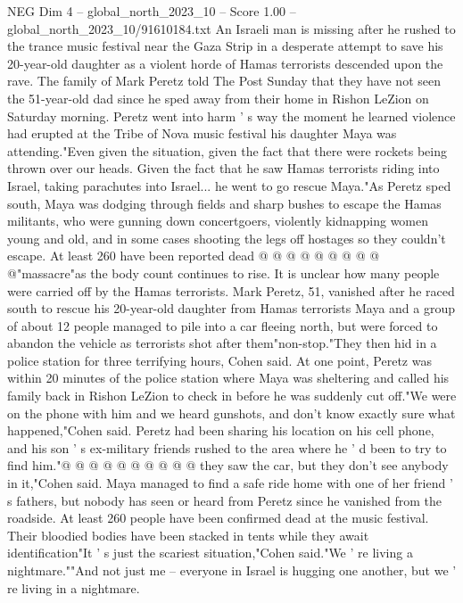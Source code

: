 \begin{textsample}{NEG Dim 4 – global\_north\_2023\_10 – Score 1.00 – global\_north\_2023\_10/91610184.txt}  \label{ex:f4_neg_004}
An Israeli man is missing after he rushed to the trance music festival near the Gaza Strip in a desperate attempt to save his 20-year-old daughter as a violent horde of Hamas terrorists descended upon the rave.
The family of Mark Peretz told The Post Sunday that they have not seen the 51-year-old dad since he sped away from their home in Rishon LeZion on Saturday morning.
Peretz went into harm ' s way the moment he learned violence had erupted at the Tribe of Nova music festival his daughter Maya was attending."Even given the situation, given the fact that there were rockets being thrown over our heads.
Given the fact that he saw Hamas terrorists riding into Israel, taking parachutes into Israel... he went to go rescue Maya."As Peretz sped south, Maya was dodging through fields and sharp bushes to escape the Hamas militants, who were gunning down concertgoers, violently kidnapping women young and old, and in some cases shooting the legs off hostages so they couldn't escape.
At least 260 have been reported dead @ @ @ @ @ @ @ @ @ @"massacre"as the body count continues to rise.
It is unclear how many people were carried off by the Hamas terrorists.
Mark Peretz, 51, vanished after he raced south to rescue his 20-year-old daughter from Hamas terrorists Maya and a group of about 12 people managed to pile into a car fleeing north, but were forced to abandon the vehicle as terrorists shot after them"non-stop."They then hid in a police station for three terrifying hours, Cohen said.
At one point, Peretz was within 20 minutes of the police station where Maya was sheltering and called his family back in Rishon LeZion to check in before he was suddenly cut off."We were on the phone with him and we heard gunshots, and don't know exactly sure what happened,"Cohen said.
Peretz had been sharing his location on his cell phone, and his son ' s ex-military friends rushed to the area where he ' d been to try to find him."@ @ @ @ @ @ @ @ @ @ they saw the car, but they don't see anybody in it,"Cohen said.
Maya managed to find a safe ride home with one of her friend ' s fathers, but nobody has seen or heard from Peretz since he vanished from the roadside.
At least 260 people have been confirmed dead at the music festival.
Their bloodied bodies have been stacked in tents while they await identification"It ' s just the scariest situation,"Cohen said."We ' re living a nightmare.""And not just me -- everyone in Israel is hugging one another, but we ' re living in a nightmare.

\end{textsample}
